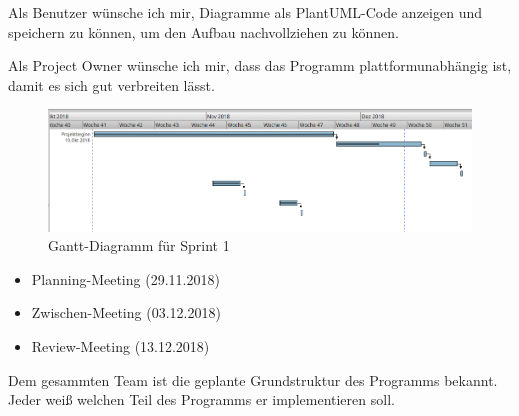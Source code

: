 Als Benutzer wünsche ich mir, Diagramme als PlantUML-Code anzeigen und speichern zu können, um den Aufbau nachvollziehen zu können.
\nsecend

Als Project Owner wünsche ich mir, dass das Programm plattformunabhängig ist, damit es sich gut verbreiten lässt.
\nsecend
\nsecend %

\begin{figure}[hbtp]
\centering
\includegraphics[width=\textwidth]{Bilder/gantt}
\caption{Gantt-Diagramm für Sprint 1}
\end{figure}
\nsecend

\begin{itemize}
\item Planning-Meeting (29.11.2018)
\item Zwischen-Meeting (03.12.2018)
\item Review-Meeting (13.12.2018)
\end{itemize}
\nsecend

Dem gesammten Team ist die geplante Grundstruktur des Programms bekannt. Jeder weiß welchen Teil des Programms er implementieren soll.
\nsecend

